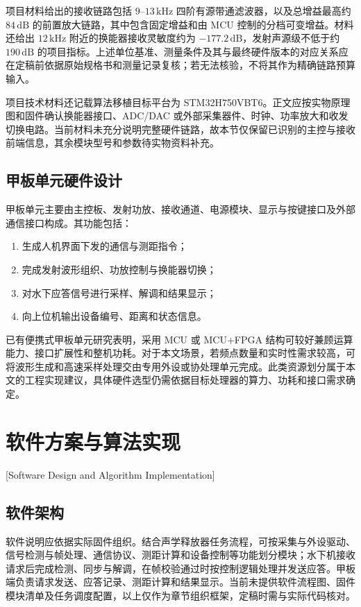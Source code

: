 项目材料给出的接收链路包括 $9$--$13\,\mathrm{kHz}$ 四阶有源带通滤波器，以及总增益最高约 $84\,\mathrm{dB}$ 的前置放大链路，其中包含固定增益和由 MCU 控制的分档可变增益。材料还给出 $12\,\mathrm{kHz}$ 附近的换能器接收灵敏度约为 $-177.2\,\mathrm{dB}$，发射声源级不低于约 $190\,\mathrm{dB}$ 的项目指标。上述单位基准、测量条件及其与最终硬件版本的对应关系应在定稿前依据原始规格书和测量记录复核；若无法核验，不将其作为精确链路预算输入。

项目技术材料还记载算法移植目标平台为 STM32H750VBT6。正文应按实物原理图和固件确认换能器接口、ADC/DAC 或外部采集器件、时钟、功率放大和收发切换电路。当前材料未充分说明完整硬件链路，故本节仅保留已识别的主控与接收前端信息，其余模块型号和参数待实物资料补充。

\subsection{甲板单元硬件设计}

甲板单元主要由主控板、发射功放、接收通道、电源模块、显示与按键接口及外部通信接口构成。其功能包括：

\begin{enumerate}
  \item 生成人机界面下发的通信与测距指令；
  \item 完成发射波形组织、功放控制与换能器切换；
  \item 对水下应答信号进行采样、解调和结果显示；
  \item 向上位机输出设备编号、距离和状态信息。
\end{enumerate}

已有便携式甲板单元研究表明，采用 MCU 或 MCU+FPGA 结构可较好兼顾运算能力、接口扩展性和整机功耗\cite{zhangDesignImplementationPortable2018,CaoMingChengJiYuSTM32H7DeDuoGongNengBianXiShiJiaBanDanYuanYanJiuSheJi2021}。对于本文场景，若频点数量和实时性需求较高，可将波形生成和高速采样处理交由专用外设或协处理单元完成。此类资源划分属于本文的工程实现建议，具体硬件选型仍需依据目标处理器的算力、功耗和接口需求确定。

\section{软件方案与算法实现}[Software Design and Algorithm Implementation]

\subsection{软件架构}

软件说明应依据实际固件组织。结合声学释放器任务流程，可按采集与外设驱动、信号检测与帧处理、通信协议、测距计算和设备控制等功能划分模块；水下机接收请求后完成检测、同步与解调，在帧校验通过时按控制逻辑处理并发送应答。甲板端负责请求发送、应答记录、测距计算和结果显示。当前未提供软件流程图、固件模块清单及任务调度配置，以上仅作为章节组织框架，定稿时需与实际代码核对。

